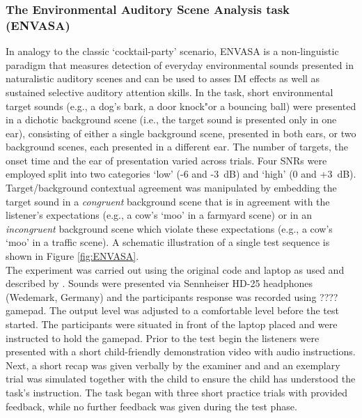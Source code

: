\documentclass[a4paper, twoside]{templates/ociamthesis}
\begin{document}
\hypertarget{the-environmental-auditory-scene-analysis-task-envasa}{%
\subsubsection{The Environmental Auditory Scene Analysis task (ENVASA)}\label{the-environmental-auditory-scene-analysis-task-envasa}}

In analogy to the classic `cocktail-party' scenario, ENVASA is a non-linguistic paradigm \autocite{Leech2009} that measures detection of everyday environmental sounds presented in naturalistic auditory scenes and can be used to asses IM effects as well as sustained selective auditory attention skills. In the task, short environmental target sounds (e.g., a dog's bark, a door knock"or a bouncing ball) were presented in a dichotic background scene (i.e., the target sound is presented only in one ear), consisting of either a single background scene, presented in both ears, or two background scenes, each presented in a different ear. The number of targets, the onset time and the ear of presentation varied across trials. Four SNRs were employed split into two categories `low' (-6 and -3~dB) and `high' (0 and +3~dB). Target/background contextual agreement was manipulated by embedding the target sound in a \emph{congruent} background scene that is in agreement with the listener's expectations (e.g., a cow's `moo' in a farmyard scene) or in an \emph{incongruent} background scene which violate these expectations (e.g., a cow's `moo' in a traffic scene). A schematic illustration of a single test sequence is shown in Figure \ref{fig:ENVASA}.\\

The experiment was carried out using the original code and laptop as used and described by \textcite{Leech2009}. Sounds were presented via Sennheiser HD-25 headphones (Wedemark, Germany) and the participants response was recorded using ???? gamepad. The output level was adjusted to a comfortable level before the test started. The participants were situated in front of the laptop placed and were instructed to hold the gamepad. Prior to the test begin the listeners were presented with a short child-friendly demonstration video with audio instructions. Next, a short recap was given verbally by the examiner and and an exemplary trial was simulated together with the child to ensure the child has understood the task's instruction. The task began with three short practice trials with provided feedback, while no further feedback was given during the test phase.\\
\end{document}
